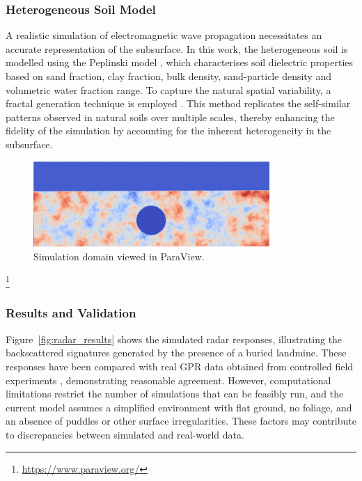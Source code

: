     \subsubsection{Heterogeneous Soil Model}
    
        A realistic simulation of electromagnetic wave propagation necessitates an accurate representation of the subsurface. In this work, the heterogeneous soil is modelled using the Peplinski model \cite{dummyRef4}, which characterises soil dielectric properties based on sand fraction, clay fraction, bulk density, sand-particle density and volumetric water fraction range. To capture the natural spatial variability, a fractal generation technique is employed \cite{dummyRef5}. This method replicates the self-similar patterns observed in natural soils over multiple scales, thereby enhancing the fidelity of the simulation by accounting for the inherent heterogeneity in the subsurface.
    
        \begin{figure}[htbp]
            \centering
            \includegraphics[width=0.8\textwidth]{figs/Rory/radar_domain.pdf}
            \caption{Simulation domain viewed in ParaView.}
            \label{fig:radar_domain}
        \end{figure}
        \footnote{\url{https://www.paraview.org/}}
    
    \subsubsection{Results and Validation}
    
        Figure~\ref{fig:radar_results} shows the simulated radar responses, illustrating the backscattered signatures generated by the presence of a buried landmine. These responses have been compared with real GPR data obtained from controlled field experiments \cite{dummyRef7}, demonstrating reasonable agreement. However, computational limitations restrict the number of simulations that can be feasibly run, and the current model assumes a simplified environment with flat ground, no foliage, and an absence of puddles or other surface irregularities. These factors may contribute to discrepancies between simulated and real-world data.
    
